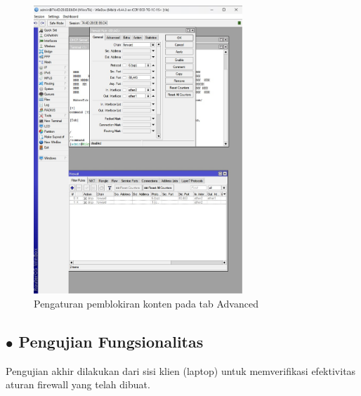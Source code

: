 \begin{enumerate}
\begin{figure}[H]
        \includegraphics[width=0.7\textwidth]{img4/firewallblock.jpeg}
        \caption{Pengaturan pemblokiran konten pada tab Advanced}
    \end{figure}
\end{enumerate}

\subsection*{$\bullet$ Pengujian Fungsionalitas}
Pengujian akhir dilakukan dari sisi klien (laptop) untuk memverifikasi efektivitas aturan firewall yang telah dibuat.

